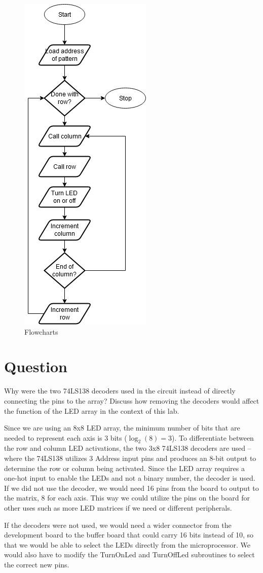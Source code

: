 \documentclass[12pt]{article}
\begin{document}
\begin{figure}
    \includegraphics[scale=0.5]{Lab4/Lab4c.png}
    \caption{Flowcharts}
\end{figure}

\section{Question}
Why were the two 74LS138 decoders used in the circuit instead of directly connecting the pins to the array? Discuss how removing the decoders would affect the function of the LED array in the context of this lab.

Since we are using an 8x8 LED array, the minimum number of bits that are needed to represent each axis is 3 bits ($\log_2(8) = 3$). To differentiate between the row and column LED activations, the two 3x8 74LS138 decoders are used -- where the 74LS138 utilizes 3 Address input pins and produces an 8-bit output to determine the row or column being activated. Since the LED array requires a one-hot input to enable the LEDs and not a binary number, the decoder is used. If we did not use the decoder, we would need 16 pins from the board to output to the matrix, 8 for each axis. This way we could utilize the pins on the board for other uses such as more LED matrices if we need or different peripherals.

If the decoders were not used, we would need a wider connector from the development board to the buffer board that could carry 16 bits instead of 10, so that we would be able to select the LEDs directly from the microprocessor. We would also have to modify the TurnOnLed and TurnOffLed subroutines to select the correct new pins.
\end{document}
